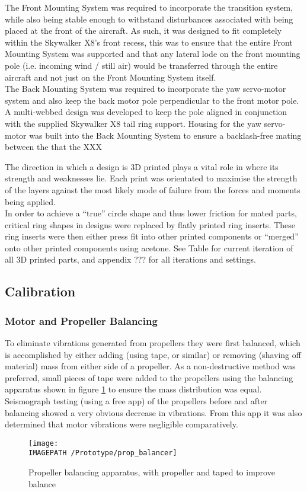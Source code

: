 The Front Mounting System was required to incorporate the transition system, while also being stable enough to withstand disturbances associated with being placed at the front of the aircraft. As such, it was designed to fit completely within the Skywalker X8's front recess, this was to ensure that the entire Front Mounting System was supported and that any lateral lode on the front mounting pole (i.e. incoming wind / still air) would be transferred through the entire aircraft and not just on the Front Mounting System itself.\\

The Back Mounting System was required to incorporate the yaw servo-motor system and also keep the back motor pole perpendicular to the front motor pole. A multi-webbed design was developed to keep the pole aligned in conjunction with the supplied Skywalker X8 tail ring support. Housing for the yaw servo-motor was built into the Back Mounting System to ensure a backlash-free mating between the that the XXX

The direction in which a design is 3D printed plays a vital role in where its strength and weaknesses lie. Each print was orientated to maximise the strength of the layers against the most likely mode of failure from the forces and moments being applied.\\
In order to achieve a ``true'' circle shape and thus lower friction for mated parts, critical ring shapes in designs were replaced by flatly printed ring inserts. These ring inserts were then either press fit into other printed components or ``merged'' onto other printed components using acetone. See Table \red{[REF]} for current iteration of all 3D printed parts, and appendix ??? for all iterations and settings. 

\subsection{Calibration}
\subsubsection*{Motor and Propeller Balancing}
To eliminate vibrations generated from propellers they were first balanced, which is accomplished by either adding (using tape, or similar) or removing (shaving off material) mass from either side of a propeller. As a non-destructive method was preferred, small pieces of tape were added to the propellers using the balancing apparatus shown in figure \ref{fig:propbalancing} to ensure the mass distribution was equal.  Seismograph testing (using a free app) of the propellers before and after balancing showed a very obvious decrease in vibrations. From this app it was also determined that motor vibrations were negligible comparatively.
\begin{figure}[!h]
	\centering
	\texttt{[image: \\IMAGEPATH /Prototype/prop\_balancer]}
	\caption{Propeller balancing apparatus, with propeller and taped to improve balance}
	\label{fig:propbalancing}
\end{figure}


